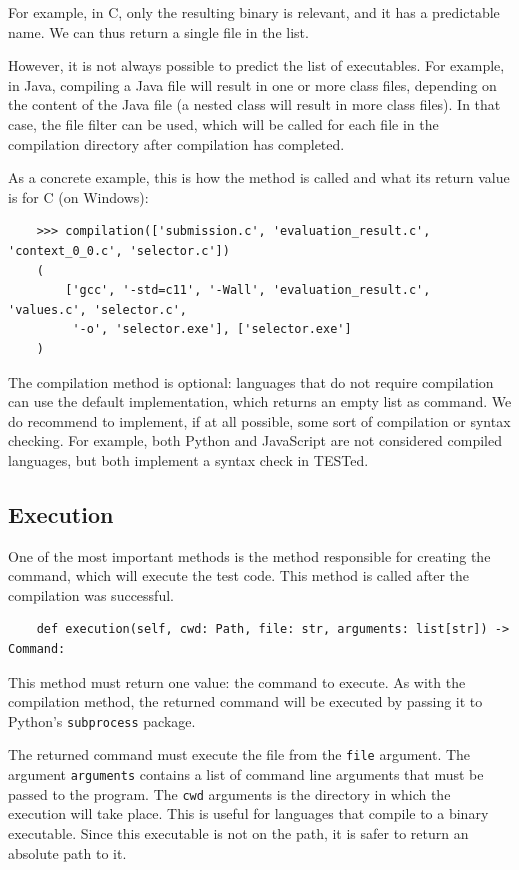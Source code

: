 \documentclass[../main]{subfiles}
\begin{document}
For example, in C, only the resulting binary is relevant, and it has a predictable name.
We can thus return a single file in the list.

However, it is not always possible to predict the list of executables.
For example, in Java, compiling a Java file will result in one or more class files, depending on the content of the Java file (a nested class will result in more class files).
In that case, the file filter can be used, which will be called for each file in the compilation directory after compilation has completed.

As a concrete example, this is how the method is called and what its return value is for C (on Windows):

\begin{verbatim}
    >>> compilation(['submission.c', 'evaluation_result.c', 'context_0_0.c', 'selector.c'])
    (
        ['gcc', '-std=c11', '-Wall', 'evaluation_result.c', 'values.c', 'selector.c',
         '-o', 'selector.exe'], ['selector.exe']
    )
\end{verbatim}

The compilation method is optional: languages that do not require compilation can use the default implementation, which returns an empty list as command.
We do recommend to implement, if at all possible, some sort of compilation or syntax checking.
For example, both Python and JavaScript are not considered compiled languages, but both implement a syntax check in TESTed.

\subsection{Execution}\label{subsec:impl-execution}

One of the most important methods is the method responsible for creating the command, which will execute the test code.
This method is called after the compilation was successful.

\begin{verbatim}
    def execution(self, cwd: Path, file: str, arguments: list[str]) -> Command:
\end{verbatim}

This method must return one value: the command to execute.
As with the compilation method, the returned command will be executed by passing it to Python's \texttt{subprocess} package.

The returned command must execute the file from the \texttt{file} argument.
The argument \texttt{arguments} contains a list of command line arguments that must be passed to the program.
The \texttt{cwd} arguments is the directory in which the execution will take place.
This is useful for languages that compile to a binary executable.
Since this executable is not on the path, it is safer to return an absolute path to it.
\end{document}
